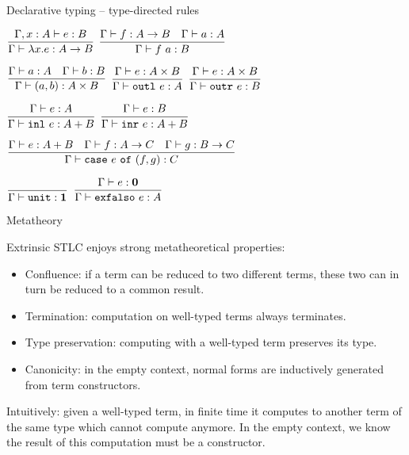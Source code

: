\documentclass{beamer}
\newcommand{\Fun}[2]{#1 \to #2}
\newcommand{\Prod}[2]{#1 \times #2}
\newcommand{\Sum}[2]{#1 + #2}
\newcommand{\Unit}{\textbf{1}}
\newcommand{\Empty}{\textbf{0}}
\newcommand{\fun}[2]{\lambda #1. #2}
\newcommand{\app}[2]{#1\ #2}
\newcommand{\pair}[2]{(#1, #2)}
\newcommand{\outl}[1][]{\texttt{outl}\ #1}
\newcommand{\outr}[1][]{\texttt{outr}\ #1}
\newcommand{\inl}[1][]{\texttt{inl}\ #1}
\newcommand{\inr}[1][]{\texttt{inr}\ #1}
\newcommand{\case}[3]{\texttt{case}\ #1\ \texttt{of}\ (#2, #3)}
\newcommand{\unit}{\texttt{unit}}
\newcommand{\exfalso}[1][]{\texttt{exfalso}\ #1}
\newcommand{\fulltyping}[3]{#1 \vdash #2 : #3}
\newcommand{\typing}[2]{\fulltyping{\Gamma}{#1}{#2}}
\newcommand{\infrule}[3][]{\displaystyle \frac{#2}{#3} \textsc{\footnotesize{#1}}}
\newcommand{\extend}[3]{#1, #2 : #3}
\begin{document}
\begin{frame}{Declarative typing -- type-directed rules}

\begin{center}
  $\infrule{\fulltyping{\extend{\Gamma}{x}{A}}{e}{B}}{\typing{\fun{x}{e}}{\Fun{A}{B}}}$ \quad
  $\infrule{\typing{f}{\Fun{A}{B}} \quad \typing{a}{A}}{\typing{\app{f}{a}}{B}}$

  \vspace{2em}

  $\infrule{\typing{a}{A} \quad \typing{b}{B}}{\typing{\pair{a}{b}}{\Prod{A}{B}}}$ \quad
  $\infrule{\typing{e}{\Prod{A}{B}}}{\typing{\outl[e]}{A}}$ \quad
  $\infrule{\typing{e}{\Prod{A}{B}}}{\typing{\outr[e]}{B}}$

  \vspace{2em}

  $\infrule{\typing{e}{A}}{\typing{\inl[e]}{\Sum{A}{B}}}$ \quad
  $\infrule{\typing{e}{B}}{\typing{\inr[e]}{\Sum{A}{B}}}$

  \vspace{2em}

  $\infrule{\typing{e}{\Sum{A}{B}} \quad \typing{f}{\Fun{A}{C}} \quad \typing{g}{\Fun{B}{C}}}{\typing{\case{e}{f}{g}}{C}}$

  \vspace{2em}

  $\infrule{}{\typing{\unit}{\Unit}}$ \quad
  $\infrule{\typing{e}{\Empty}}{\typing{\exfalso[e]}{A}}$
\end{center}

\end{frame}

\begin{frame}{Metatheory}

Extrinsic STLC enjoys strong metatheoretical properties:

\begin{itemize}
  \item Confluence: if a term can be reduced to two different terms, these two can in turn be reduced to a common result.
  \item Termination: computation on well-typed terms always terminates.
  \item Type preservation: computing with a well-typed term preserves its type.
  \item Canonicity: in the empty context, normal forms are inductively generated from term constructors.
\end{itemize}

Intuitively: given a well-typed term, in finite time it computes to another term of the same type which cannot compute anymore. In the empty context, we know the result of this computation must be a constructor.

\end{frame}
\end{document}
